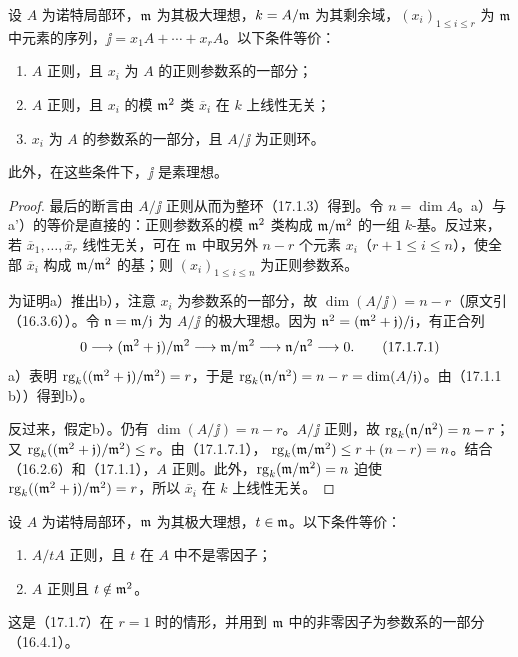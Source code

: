 设 $A$ 为诺特局部环，$\mathfrak m$ 为其极大理想，$k=A/\mathfrak m$ 为其剩余域，$(x_i)_{1\leq i\leq r}$ 为 $\mathfrak m$ 中元素的序列，$\jj=x_1A+\cdots+x_rA$。以下条件等价：
\begin{enumerate}[label=\alph*)]
 \item $A$ 正则，且 $x_i$ 为 $A$ 的正则参数系的一部分；
 \item[$\mathrm a')$] $A$ 正则，且 $x_i$ 的模 $\mathfrak m^2$ 类 $\overline x_i$ 在 $k$ 上线性无关；
 \item[\(\mathrm b)\)] $x_i$ 为 $A$ 的参数系的一部分，且 $A/\jj$ 为正则环。
\end{enumerate}
此外，在这些条件下，$\jj$ 是素理想。
\begin{proof}
最后的断言由 $A/\jj$ 正则从而为整环（17.1.3）得到。令 $n=\dim A$。a）与a'）的等价是直接的：正则参数系的模 $\mathfrak m^2$ 类构成 $\mathfrak m/\mathfrak m^2$ 的一组 $k$-基。反过来，若 $\overline x_1,\ldots,\overline x_r$ 线性无关，可在 $\mathfrak m$ 中取另外 $n-r$ 个元素 $x_i$（$r+1\leq i\leq n$），使全部 $\overline x_i$ 构成 $\mathfrak m/\mathfrak m^2$ 的基；则 $(x_i)_{1\leq i\leq n}$ 为正则参数系。

为证明a）推出b），注意 $x_i$ 为参数系的一部分，故 $\dim(A/\jj)=n-r$（原文引（16.3.6））。令 $\mathfrak n=\mathfrak m/\mathfrak j$ 为 $A/\jj$ 的极大理想。因为 $\mathfrak n^2=(\mathfrak m^2+\mathfrak j)/\mathfrak j$，有正合列
\begin{equation}
 0\longrightarrow(\mathfrak m^2+\mathfrak j)/\mathfrak m^2\longrightarrow\mathfrak m/\mathfrak m^2
 \longrightarrow\mathfrak n/\mathfrak n^2\longrightarrow0.
 \tag{17.1.7.1}
\end{equation}
a）表明 $\operatorname{rg}_k((\mathfrak m^2+\mathfrak j)/\mathfrak m^2)=r$，于是
$\operatorname{rg}_k(\mathfrak n/\mathfrak n^2)=n-r=\dim(A/\mathfrak j)$。由（17.1.1 b））得到b）。

反过来，假定b）。仍有 $\dim(A/\jj)=n-r$。$A/\jj$ 正则，故 $\operatorname{rg}_k(\mathfrak n/\mathfrak n^2)=n-r$；又
$\operatorname{rg}_k((\mathfrak m^2+\mathfrak j)/\mathfrak m^2)\leq r$。由（17.1.7.1），
$\operatorname{rg}_k(\mathfrak m/\mathfrak m^2)\leq r+(n-r)=n$。结合（16.2.6）和（17.1.1），$A$ 正则。此外，$\operatorname{rg}_k(\mathfrak m/\mathfrak m^2)=n$ 迫使
$\operatorname{rg}_k((\mathfrak m^2+\mathfrak j)/\mathfrak m^2)=r$，所以 $\overline x_i$ 在 $k$ 上线性无关。
\end{proof}

设 $A$ 为诺特局部环，$\mathfrak m$ 为其极大理想，$t\in\mathfrak m$。以下条件等价：
\begin{enumerate}[label=\alph*)]
 \item $A/tA$ 正则，且 $t$ 在 $A$ 中不是零因子；
 \item $A$ 正则且 $t\notin\mathfrak m^2$。
\end{enumerate}
这是（17.1.7）在 $r=1$ 时的情形，并用到 $\mathfrak m$ 中的非零因子为参数系的一部分（16.4.1）。

